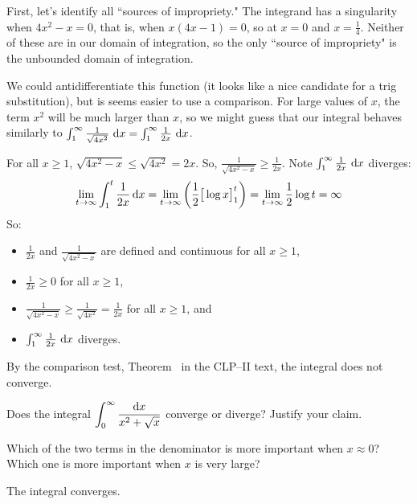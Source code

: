 \begin{solution}
First, let's identify all ``sources of impropriety." The integrand has a singularity when $4x^2-x=0$, that is, when $x(4x-1)=0$, so at $x=0$ and $x=\frac{1}{4}$. Neither of these are in our domain of integration, so the only ``source of impropriety" is the unbounded domain of integration.

We could antidifferentiate this function (it looks like a nice candidate for a trig substitution), but is seems easier to use a comparison. For large values of $x$, the term $x^2$ will be much larger than $x$, so we might guess that our integral behaves similarly to $\int_1^\infty \frac{1}{\sqrt{4x^2}}~\mathrm{d}x=\int_1^\infty \frac{1}{2x}~\mathrm{d}x$.


For all $x\ge 1$, $\sqrt{4x^2-x}\le\sqrt{4x^2}=2x$. So, $\frac{1}{\sqrt{4x^2-x}} \geq \frac{1}{2x}$. Note $\int_1^\infty \frac{1}{2x}~\mathrm{d}x$ diverges:
\begin{align*}\lim_{t\rightarrow\infty}\int_1^t\frac{1}{2x}\,\mathrm{d}x
=\lim_{t\rightarrow\infty}\left(\frac{1}{2} \big[\log x\big]_1^t\right)
=\lim_{t\rightarrow\infty}\frac{1}{2} \log t
=\infty
\end{align*}
So:
\begin{itemize}
\item $\frac{1}{2x}$ and $\frac{1}{\sqrt{4x^2-x}}$ are defined and continuous for all $x \geq 1$,
\item $\frac{1}{2x} \geq 0$ for all $x \geq 1$,
\item $\frac{1}{\sqrt{4x^2-x}} \ge\frac{1}{\sqrt{4x^2}} = \frac{1}{2x} $ for all $x \ge 1$, and
\item $\int_1^\infty \frac{1}{2x}~\mathrm{d}x$ diverges.
\end{itemize}
By the comparison test, Theorem~ in the CLP--II text, the integral does not converge.
\end{solution}

\begin{Mquestion}[2001A]
Does the integral $\displaystyle\int_0^\infty\frac{\mathrm{d}x}{x^2+\sqrt{x}}$
converge or diverge? Justify your claim.
\end{Mquestion}

\begin{hint}
Which of the two terms in the denominator is more important when $x\approx
0$? Which one is more important when $x$ is very large?
\end{hint}

\begin{answer}
The integral converges.
\end{answer}

